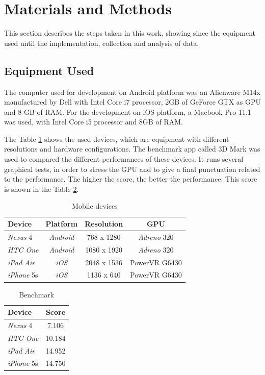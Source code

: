 \documentclass[10pt, conference, compsocconf]{IEEEtran}
\begin{document}
\section{Materials and Methods}
\label{sec:development}

This section describes the steps taken in this work, showing since the
equipment used until the implementation, collection and analysis of data.

\subsection{Equipment Used}
\label{equip}
The computer used for development on Android platform was an Alienware M14x
manufactured by Dell with Intel Core i7 processor, 2GB of GeForce GTX as GPU
and 8 GB of RAM. For the development on iOS platform, a Macbook Pro 11.1 was used, with Intel
Core i5 processor and 8GB of RAM.

  The Table \ref{equipamentos} shows the used devices, which are equipment with different
resolutions and hardware configurations. The benchmark app called
3D Mark was used to compared the different performances of these devices.
It runs several graphical tests, in order to 
stress the GPU and to give a final punctuation related to the performance. 
The higher the score, the better the performance. This score is shown
in the Table \ref{bench}.

\begin{table}[!t]
	\centering
	\caption{Mobile devices}
	\begin{tabular}{lccc}
	\hline
		\textbf{Device} & \textbf{Platform}  & \textbf{Resolution} & \textbf{GPU}  \\
	\hline	
		\textit{Nexus} 4 &  \textit{Android} & 768 x 1280 &  \textit{Adreno} 320 \\
		
		\textit{HTC One} &  \textit{Android} & 1080 x 1920 &  \textit{Adreno} 320 \\ 
		\textit{iPad Air} &  \textit{iOS} & 2048 x 1536  &  PowerVR G6430 \\
		
	\textit{iPhone} 5s &  \textit{iOS} & 1136 x 640  &  PowerVR G6430 \\
	\hline
	\end{tabular}
	\label{equipamentos}
\end{table}


\begin{table}[!t]
	\centering
	\caption{Benchmark}
	\begin{tabular}{lc}
	\hline
		\textbf{Device} & \textbf{Score} \\
	\hline
		\textit{Nexus} 4 & 7.106\\
		\textit{HTC One} & 10.184\\ 
		\textit{iPad Air} & 14.952\\
		\textit{iPhone} 5s & 14.750\\
	\hline
	\end{tabular}
	\label{bench}
\end{table}
\end{document}
